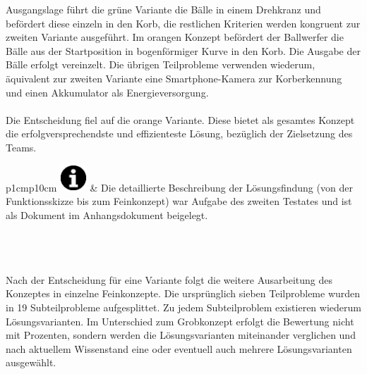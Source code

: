 Ausgangslage führt die grüne Variante die Bälle in einem Drehkranz und befördert diese einzeln
in den Korb, die restlichen Kriterien werden kongruent zur zweiten Variante ausgeführt. Im
orangen Konzept befördert der Ballwerfer die Bälle aus der Startposition in bogenförmiger 
Kurve in den Korb. Die Ausgabe der Bälle erfolgt vereinzelt. Die übrigen Teilprobleme verwenden
wiederum, äquivalent zur zweiten Variante eine Smartphone-Kamera zur Korberkennung und einen
Akkumulator als Energieversorgung.\\
\\
Die Entscheidung fiel auf die orange Variante. Diese bietet als gesamtes Konzept die
erfolgversprechendste und effizienteste Lösung, bezüglich der Zielsetzung des Teams. \\

\begin{tabular}{p{1cm}p{10cm}}
		{\includegraphics[width=1cm]{Enddokumentation/Varianten/Bilder/info_icon.png}}
	 & Die detaillierte Beschreibung der Lösungsfindung (von der Funktionsskizze bis zum
	 Feinkonzept) war Aufgabe des zweiten Testates und ist als Dokument im Anhangsdokument beigelegt. \\
\end{tabular}\\
\\
\\
Nach der Entscheidung für eine Variante folgt die weitere Ausarbeitung des Konzeptes
in einzelne Feinkonzepte. Die ursprünglich sieben Teilprobleme wurden in 19 Subteilprobleme
aufgesplittet. Zu jedem Subteilproblem existieren wiederum Lösungsvarianten. Im Unterschied 
zum Grobkonzept erfolgt die Bewertung nicht mit Prozenten, sondern werden die Lösungsvarianten
miteinander verglichen und nach aktuellem Wissenstand eine oder eventuell auch mehrere
Lösungsvarianten ausgewählt. 



